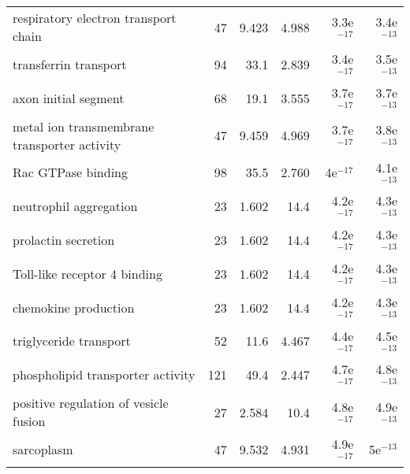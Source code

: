 \begin{longtable}{lrrrrr}
              respiratory electron transport chain &                      47 &                   9.423 &      4.988 &         3.3e$^{-17}$ &         3.4e$^{-13}$ \\
                             transferrin transport &                      94 &                    33.1 &      2.839 &         3.4e$^{-17}$ &         3.5e$^{-13}$ \\
                              axon initial segment &                      68 &                    19.1 &      3.555 &         3.7e$^{-17}$ &         3.7e$^{-13}$ \\
      metal ion transmembrane transporter activity &                      47 &                   9.459 &      4.969 &         3.7e$^{-17}$ &         3.8e$^{-13}$ \\
                                Rac GTPase binding &                      98 &                    35.5 &      2.760 &           4e$^{-17}$ &         4.1e$^{-13}$ \\
                            neutrophil aggregation &                      23 &                   1.602 &       14.4 &         4.2e$^{-17}$ &         4.3e$^{-13}$ \\
                               prolactin secretion &                      23 &                   1.602 &       14.4 &         4.2e$^{-17}$ &         4.3e$^{-13}$ \\
                      Toll-like receptor 4 binding &                      23 &                   1.602 &       14.4 &         4.2e$^{-17}$ &         4.3e$^{-13}$ \\
                              chemokine production &                      23 &                   1.602 &       14.4 &         4.2e$^{-17}$ &         4.3e$^{-13}$ \\
                            triglyceride transport &                      52 &                    11.6 &      4.467 &         4.4e$^{-17}$ &         4.5e$^{-13}$ \\
                 phospholipid transporter activity &                     121 &                    49.4 &      2.447 &         4.7e$^{-17}$ &         4.8e$^{-13}$ \\
             positive regulation of vesicle fusion &                      27 &                   2.584 &       10.4 &         4.8e$^{-17}$ &         4.9e$^{-13}$ \\
                                        sarcoplasm &                      47 &                   9.532 &      4.931 &         4.9e$^{-17}$ &           5e$^{-13}$ \\

\end{longtable}
